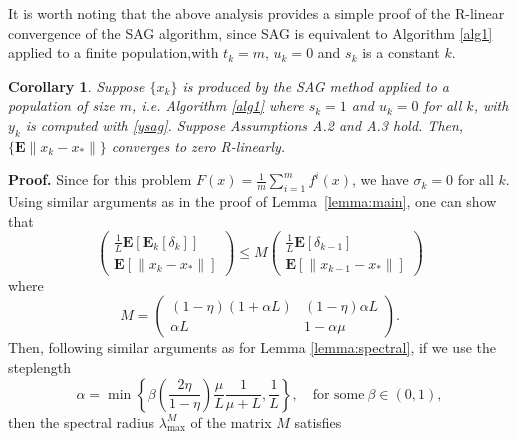\documentclass[11pt]{article}
\newtheorem{cor}[thm]{Corollary}
\newcommand{\E}{\mathbf{E}}
\begin{document}
It is worth noting that the above analysis provides a simple proof of the R-linear convergence of the SAG algorithm, since SAG 
is equivalent to Algorithm \ref{alg1} applied to a finite population,with $t_k =m$, $u_k=0$  and $s_k$ is a constant $k$. 

\begin{cor}\label{thm:sag}
Suppose $\{x_k\}$ is produced by the SAG method applied to a population of size $m$, i.e. Algorithm \ref{alg1} where $s_k=1$ and $u_k=0$ for all $k$, with  $y_k$ is computed with \eqref{ysag}.
 Suppose Assumptions A.2 and A.3 hold.  Then, $\{\E\|x_k-x_\ast\|\}$  converges to zero R-linearly.
\end{cor}

\noindent 
\textbf{Proof.}  Since for this problem $F(x) =  \frac{1}{m} \sum_{i =1}^m f^i(x) $, we have $\sigma_k=0$ for all $k$. Using similar arguments as in the proof of Lemma~\ref{lemma:main}, one can show that
\begin{equation}\label{sagrecur}
 \begin{pmatrix} \frac{1}{L}\E[\E_k[\delta_k]]\\ \E[\|x_k-x_\ast \|]  \end{pmatrix} 
\leq M
 \begin{pmatrix} \frac{1}{L}\E[\delta_{k-1}] \\ \E[\| x_{k-1}-x_\ast \|]  \end{pmatrix} 
\end{equation}
where
\begin{equation}\label{M2}
 M = \begin{pmatrix} (1-\eta)(1+\alpha  L)  &   (1-\eta)\alpha L \\  
                   \alpha L  & 1-\alpha \mu 
                    \end{pmatrix}.                   
\end{equation}
Then, following similar arguments as for Lemma \ref{lemma:spectral}, if we use the  steplength
 \begin{equation}\label{alphasag}
 \alpha = \min\left\lbrace\beta\left(\frac{2 \eta}{1-\eta} \right)\frac{\mu}{L}\frac{1}{\mu+L},\frac{1}{L}\right\rbrace, \quad \mbox{for some} \ \beta  \in(0,1),
 \end{equation} 
then the spectral radius $\lambda^M_{\max}$ of the matrix $M$  satisfies
\end{document}
